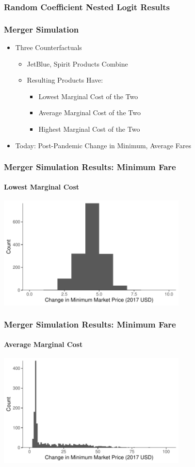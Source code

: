 \documentclass[xcolor=dvipsnames]{beamer}
\begin{document}
	\begin{frame}
		\frametitle{Random Coefficient Nested Logit Results}
		\resizebox*{2.35in}{!}{
			
	}
		
	\end{frame}
	
	\begin{frame}
		\frametitle{Merger Simulation}
		\begin{itemize}
			\item Three Counterfactuals
			\begin{itemize}
				\item JetBlue, Spirit Products Combine
				\item Resulting Products Have:
				\begin{itemize}
					\item Lowest Marginal Cost of the Two
					\item Average Marginal Cost of the Two
					\item Highest Marginal Cost of the Two
				\end{itemize}
			\end{itemize}
			\item Today: Post-Pandemic Change in Minimum, Average Fares
		\end{itemize}
	\end{frame}
	
	\begin{frame}
		\frametitle{Merger Simulation Results: Minimum Fare}
		\framesubtitle{Lowest Marginal Cost}
		\includegraphics[width = 3.75in]{Merger_Change_MinimumFare_BestCase.pdf}
	\end{frame}
		
	\begin{frame}
			\frametitle{Merger Simulation Results: Minimum Fare}
			\framesubtitle{Average Marginal Cost}
			\includegraphics[width = 3.75in]{Merger_Change_MinimumFare_AverageCase.pdf}
		\end{frame}
		
\end{document}
